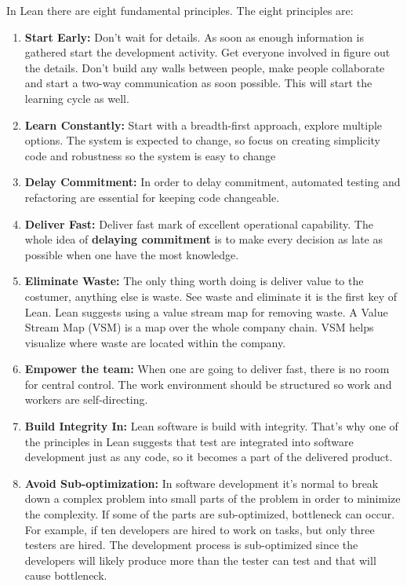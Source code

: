 \documentclass[UKenglish]{ifimaster}  %
\begin{document}
In Lean there are eight fundamental principles. The eight principles are:
\begin{enumerate}
\centering
\item \textbf{Start Early:}  Don't wait for details. As soon as enough information is gathered start the development activity. Get everyone involved in figure out the details. Don't build any walls between people, make people collaborate and start a two-way communication as soon possible. This will start the learning cycle as well.

\item \textbf{Learn Constantly:} Start with a breadth-first approach, explore multiple options. The system is expected to change, so focus on creating simplicity code and robustness so the system is easy to change

\item \textbf{Delay Commitment:} 
In order to delay commitment, automated testing and refactoring are essential for keeping code changeable. 

\item \textbf{Deliver Fast:}
Deliver fast mark of excellent operational capability. The whole idea of \textbf{delaying commitment} is to make every decision as late as possible when one have the most knowledge.
\item \textbf{Eliminate Waste:}
The only thing worth doing is deliver value to the costumer, anything else is waste.  See waste and eliminate it is the first key of Lean.  Lean suggests using a value stream map for removing waste. A Value Stream Map (VSM) is a map over the whole company chain. VSM helps visualize where waste are located within the company.
\item \textbf{Empower the team:} When one are going to deliver fast, there is no room for central control. The work environment should be structured so work and workers are self-directing.

\item \textbf{Build Integrity In:} Lean software is build with integrity. That's why one of the principles in Lean suggests that test are integrated into software development just as any code, so it becomes a part of the delivered product. 

\item \textbf{Avoid Sub-optimization:} In software development it's normal to break down a complex problem into small parts of the problem in order to minimize the complexity.  If some of the parts are sub-optimized, bottleneck can occur. For example, if ten developers are hired to work on tasks, but only three testers are hired. The development process is sub-optimized since the developers will likely produce more than the tester can test and that will cause bottleneck.
\end{enumerate}
\parencite{poppendieck2003lean}
\end{document}
